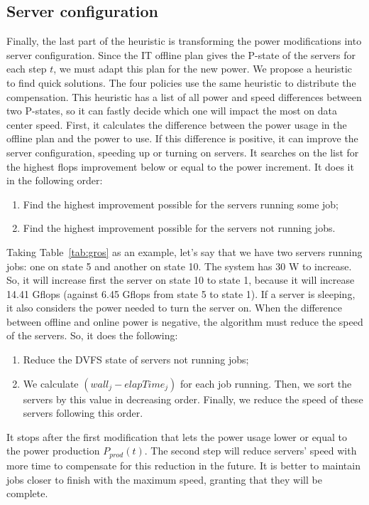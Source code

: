 \subsection{Server configuration}
\label{sec:server_configuration}

Finally, the last part of the heuristic is transforming the power modifications into server configuration. Since the IT offline plan gives the P-state of the servers for each step $t$, we must adapt this plan for the new power. We propose a heuristic to find quick solutions. The four policies use the same heuristic to distribute the compensation. This heuristic has a list of all power and speed differences between two P-states, so it can fastly decide which one will impact the most on data center speed. First, it calculates the difference between the power usage in the offline plan and the power to use. If this difference is positive, it can improve the server configuration, speeding up or turning on servers. It searches on the list for the highest flops improvement below or equal to the power increment. It does it in the following order:
\begin{enumerate}
    \item Find the highest improvement possible for the servers running some job;
    \item Find the highest improvement possible for the servers not running jobs.
\end{enumerate}

Taking Table~\ref{tab:gros} as an example, let's say that we have two servers running jobs: one on state 5 and another on state 10. The system has 30 W to increase. So, it will increase first the server on state 10 to state 1, because it will increase 14.41 Gflops (against 6.45 Gflops from state 5 to state 1). If a server is sleeping, it also considers the power needed to turn the server on. When the difference between offline and online power is negative, the algorithm must reduce the speed of the servers. So, it does the following:
\begin{enumerate}
    \item Reduce the DVFS state of servers not running jobs;
    \item We calculate $(wall_{j} - elapTime_{j})$ for each job running. Then, we sort the servers by this value in decreasing order. Finally, we reduce the speed of these servers following this order. 
\end{enumerate}

It stops after the first modification that lets the power usage lower or equal to the power production $P_{prod}(t)$. The second step will reduce servers' speed with more time to compensate for this reduction in the future. It is better to maintain jobs closer to finish with the maximum speed, granting that they will be complete.

